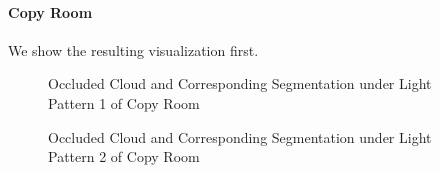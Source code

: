 \documentclass[11pt, a4paper,oneside,chapterprefix=false]{scrbook}
\begin{document}
\paragraph{Copy Room}

We show the resulting visualization first.

\begin{figure}[H]
    \centering
      \label{fig:copy 0 occluded} \hfill
     \label{fig:copy 0 seg}
    \caption{Occluded Cloud and Corresponding Segmentation under Light Pattern 1 of Copy Room}
    \label{fig:copy 0 occ and seg}
\end{figure}

\begin{figure}[H]
    \centering
      \label{fig:copy 4 occluded} \hfill
     \label{fig:copy 4 seg}
    \caption{Occluded Cloud and Corresponding Segmentation under Light Pattern 2 of Copy Room}
    \label{fig:copy 4 occ and seg}
\end{figure}
\end{document}
